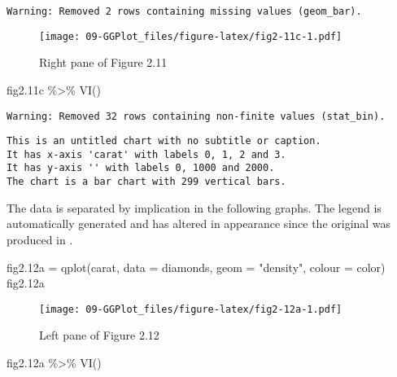 \documentclass[
]{book}
\newenvironment{Shaded}{\begin{snugshade}}{\end{snugshade}}
\newcommand{\AttributeTok}[1]{\textcolor[rgb]{0.77,0.63,0.00}{#1}}
\newcommand{\FloatTok}[1]{\textcolor[rgb]{0.00,0.00,0.81}{#1}}
\newcommand{\FunctionTok}[1]{\textcolor[rgb]{0.00,0.00,0.00}{#1}}
\newcommand{\NormalTok}[1]{#1}
\newcommand{\OtherTok}[1]{\textcolor[rgb]{0.56,0.35,0.01}{#1}}
\newcommand{\SpecialCharTok}[1]{\textcolor[rgb]{0.00,0.00,0.00}{#1}}
\newcommand{\StringTok}[1]{\textcolor[rgb]{0.31,0.60,0.02}{#1}}
\begin{document}
\begin{verbatim}
Warning: Removed 2 rows containing missing values (geom_bar).
\end{verbatim}

\begin{figure}
\centering
\texttt{[image: 09-GGPlot\_files/figure-latex/fig2-11c-1.pdf]}
\caption{\label{fig:fig2-11c}Right pane of Figure 2.11}
\end{figure}

\begin{Shaded}
\begin{Highlighting}[]
\NormalTok{fig2}\FloatTok{.11}\NormalTok{c }\SpecialCharTok{\%\textgreater{}\%} \FunctionTok{VI}\NormalTok{()   }
\end{Highlighting}
\end{Shaded}

\begin{verbatim}
Warning: Removed 32 rows containing non-finite values (stat_bin).
\end{verbatim}

\begin{verbatim}
This is an untitled chart with no subtitle or caption.
It has x-axis 'carat' with labels 0, 1, 2 and 3.
It has y-axis '' with labels 0, 1000 and 2000.
The chart is a bar chart with 299 vertical bars.
\end{verbatim}

The data is separated by implication in the following graphs. The legend is automatically generated and has altered in appearance since the original was produced in \citet{Wickham2009ggplot2}.

\begin{Shaded}
\begin{Highlighting}[]
\NormalTok{fig2}\FloatTok{.12}\NormalTok{a }\OtherTok{=} \FunctionTok{qplot}\NormalTok{(carat, }\AttributeTok{data =}\NormalTok{ diamonds, }\AttributeTok{geom =} \StringTok{"density"}\NormalTok{, }\AttributeTok{colour =}\NormalTok{ color)    }
\NormalTok{fig2}\FloatTok{.12}\NormalTok{a}
\end{Highlighting}
\end{Shaded}

\begin{figure}
\centering
\texttt{[image: 09-GGPlot\_files/figure-latex/fig2-12a-1.pdf]}
\caption{\label{fig:fig2-12a}Left pane of Figure 2.12}
\end{figure}

\begin{Shaded}
\begin{Highlighting}[]
\NormalTok{fig2}\FloatTok{.12}\NormalTok{a }\SpecialCharTok{\%\textgreater{}\%} \FunctionTok{VI}\NormalTok{()   }
\end{Highlighting}
\end{Shaded}
\end{document}
